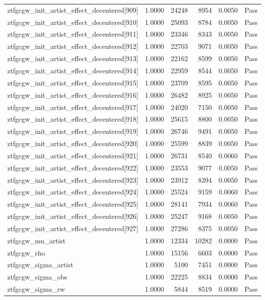 \begin{table}[htbp]
\begin{tabular}{llrrll}
ztfgcgw\_init\_artist\_effect\_decentered[909] & 1.0000 & 24248 & 8954 & 0.0050 & Pass \\
ztfgcgw\_init\_artist\_effect\_decentered[910] & 1.0000 & 25093 & 8784 & 0.0050 & Pass \\
ztfgcgw\_init\_artist\_effect\_decentered[911] & 1.0000 & 23346 & 8343 & 0.0050 & Pass \\
ztfgcgw\_init\_artist\_effect\_decentered[912] & 1.0000 & 22703 & 9071 & 0.0050 & Pass \\
ztfgcgw\_init\_artist\_effect\_decentered[913] & 1.0000 & 22162 & 8599 & 0.0050 & Pass \\
ztfgcgw\_init\_artist\_effect\_decentered[914] & 1.0000 & 22959 & 8544 & 0.0050 & Pass \\
ztfgcgw\_init\_artist\_effect\_decentered[915] & 1.0000 & 23709 & 8595 & 0.0050 & Pass \\
ztfgcgw\_init\_artist\_effect\_decentered[916] & 1.0000 & 26482 & 8925 & 0.0050 & Pass \\
ztfgcgw\_init\_artist\_effect\_decentered[917] & 1.0000 & 24020 & 7150 & 0.0050 & Pass \\
ztfgcgw\_init\_artist\_effect\_decentered[918] & 1.0000 & 25615 & 8800 & 0.0050 & Pass \\
ztfgcgw\_init\_artist\_effect\_decentered[919] & 1.0000 & 26746 & 9491 & 0.0050 & Pass \\
ztfgcgw\_init\_artist\_effect\_decentered[920] & 1.0000 & 25599 & 8839 & 0.0050 & Pass \\
ztfgcgw\_init\_artist\_effect\_decentered[921] & 1.0000 & 26731 & 8540 & 0.0060 & Pass \\
ztfgcgw\_init\_artist\_effect\_decentered[922] & 1.0000 & 23553 & 9077 & 0.0050 & Pass \\
ztfgcgw\_init\_artist\_effect\_decentered[923] & 1.0000 & 23912 & 8394 & 0.0050 & Pass \\
ztfgcgw\_init\_artist\_effect\_decentered[924] & 1.0000 & 25524 & 9159 & 0.0060 & Pass \\
ztfgcgw\_init\_artist\_effect\_decentered[925] & 1.0000 & 28141 & 7934 & 0.0060 & Pass \\
ztfgcgw\_init\_artist\_effect\_decentered[926] & 1.0000 & 25247 & 9168 & 0.0050 & Pass \\
ztfgcgw\_init\_artist\_effect\_decentered[927] & 1.0000 & 27286 & 8375 & 0.0050 & Pass \\
ztfgcgw\_mu\_artist & 1.0000 & 12334 & 10282 & 0.0000 & Pass \\
ztfgcgw\_rho & 1.0000 & 15156 & 6603 & 0.0000 & Pass \\
ztfgcgw\_sigma\_artist & 1.0000 & 5100 & 7451 & 0.0000 & Pass \\
ztfgcgw\_sigma\_obs & 1.0000 & 22225 & 8834 & 0.0000 & Pass \\
ztfgcgw\_sigma\_rw & 1.0000 & 5844 & 8519 & 0.0000 & Pass \\
\bottomrule
\end{tabular}
\end{table}

